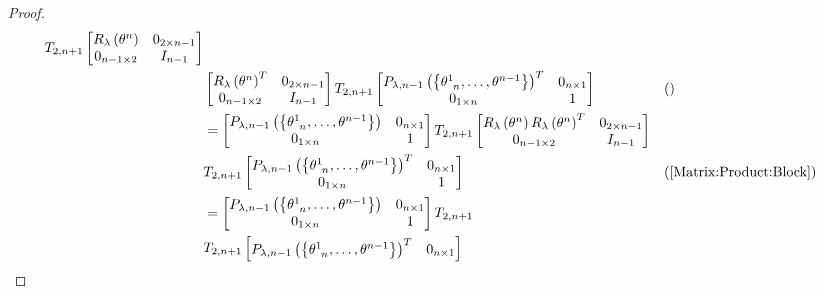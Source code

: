 \documentclass[../main.tex]{subfiles}
\begin{document}
\begin{proof}
\begin{align*}
T_{2,n+1}
\begin{bmatrix}
R_\lambda\left(\tensor{\theta}{^n}\right)&0_{{2}\times{n-1}}\\
0_{{n-1}\times{2}}&{I}_{n-1}\\
\end{bmatrix}\\
&
\begin{bmatrix}
R_\lambda\left(\tensor{\theta}{^n}\right)^T&0_{{2}\times{n-1}}\\
0_{{n-1}\times{2}}&{I}_{n-1}\\
\end{bmatrix}
T_{2,n+1}
\begin{bmatrix}
P_{\lambda,n-1}\left(\left\{\tensor{\theta}{^1_{n}},\dots,\tensor{\theta}{^{n-1}}\right\}\right)^T&0_{n\times 1}\\
0_{1\times n}&1\\
\end{bmatrix}
&&\text{()}\\
&=
\begin{bmatrix}
P_{\lambda,n-1}\left(\left\{\tensor{\theta}{^1_{n}},\dots,\tensor{\theta}{^{n-1}}\right\}\right)&0_{n\times 1}\\
0_{1\times n}&1\\
\end{bmatrix}
T_{2,n+1}
\begin{bmatrix}
R_\lambda\left(\tensor{\theta}{^n}\right)R_\lambda\left(\tensor{\theta}{^n}\right)^T&0_{{2}\times{n-1}}\\
0_{{n-1}\times{2}}&{I}_{n-1}\\
\end{bmatrix}\\
&
T_{2,n+1}
\begin{bmatrix}
P_{\lambda,n-1}\left(\left\{\tensor{\theta}{^1_{n}},\dots,\tensor{\theta}{^{n-1}}\right\}\right)^T&0_{n\times 1}\\
0_{1\times n}&1\\
\end{bmatrix}&&\text{(\cref{Matrix:Product:Block})}\\
&=
\begin{bmatrix}
P_{\lambda,n-1}\left(\left\{\tensor{\theta}{^1_{n}},\dots,\tensor{\theta}{^{n-1}}\right\}\right)&0_{n\times 1}\\
0_{1\times n}&1\\
\end{bmatrix}
T_{2,n+1}\\
&
T_{2,n+1}
\begin{bmatrix}
P_{\lambda,n-1}\left(\left\{\tensor{\theta}{^1_{n}},\dots,\tensor{\theta}{^{n-1}}\right\}\right)^T&0_{n\times 1}\\

\end{bmatrix}
\end{align*}
\end{proof}
\end{document}
